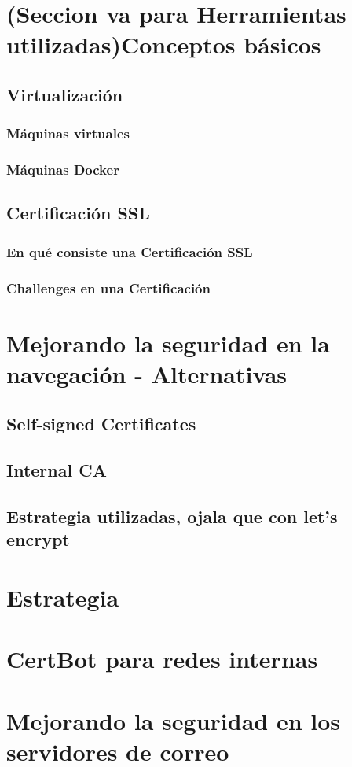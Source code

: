 


\section{ (Seccion va para Herramientas utilizadas)Conceptos básicos}
    \subsection{Virtualización}
    \subsubsection{Máquinas virtuales}
    \subsubsection{Máquinas Docker}
    \subsection{Certificación SSL}
    \subsubsection{En qué consiste una Certificación SSL}
    \subsubsection{Challenges en una Certificación}

\section{Mejorando la seguridad en la navegación - Alternativas}
\subsection{Self-signed Certificates}
\subsection{Internal CA}
\subsection{Estrategia utilizadas, ojala que con let's encrypt}
\section{Estrategia}
\section{CertBot para redes internas}
\section{Mejorando la seguridad en los servidores de correo}






